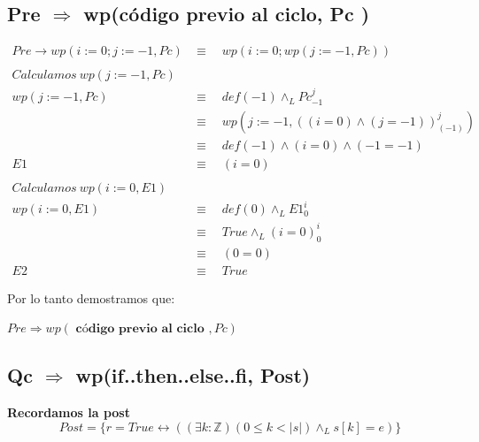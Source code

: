 \documentclass[12pt]{book}
\begin{document}
\subsection{ Pre $\Rightarrow $ wp(código previo al ciclo, Pc )}
\begin{align*}
Pre \rightarrow wp(i:= 0; j := -1, Pc ) & \equiv \quad wp(i := 0; wp(j := -1, Pc )) \\ \\
Calculamos \ wp(j := -1, Pc ) & \\ 
wp(j := -1, Pc ) &\equiv \quad  def (-1) \wedge_L Pc_{-1}^j \\
 &\equiv \quad wp(j := -1, \left( (i = 0) \wedge (j = -1)\right)_{(-1)}^j ) \\
&\equiv \quad def (-1) \wedge (i = 0) \wedge (-1 = -1) \\
E1 &\equiv \quad  (i = 0) \\ \\
Calculamos \ wp(i := 0, E1) & \\
wp(i := 0, E1 ) &\equiv \quad  def (0) \wedge_L E1_{0}^i  \\
&\equiv \quad  True \wedge_L (i = 0)_{0}^i \\
&\equiv \quad (0 = 0) \\
E2 &\equiv \quad True 
\end{align*}
\begin{shaded}
Por lo tanto demostramos que: 
\begin{center}
$ Pre \Rightarrow wp( \textbf{ c\'odigo previo al ciclo } , Pc) $
\end{center}
\end{shaded}
\subsection{ Qc $\Rightarrow$ wp(if..then..else..fi, Post)}
\textbf{Recordamos la post } 
\[ Post = \{ r = True \leftrightarrow ((\exists k :\mathbb{Z})(0 \leq k < |s|) \wedge_L s[k] = e)\}  \]
\end{document}
